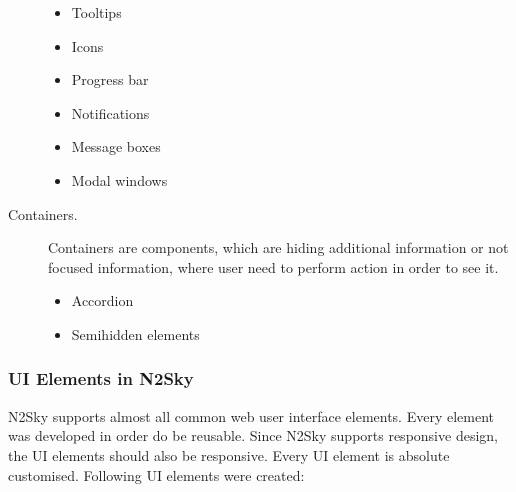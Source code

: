 \begin{description}
\begin{itemize}
\item Tooltips
\item Icons
\item Progress bar
\item Notifications
\item Message boxes
\item Modal windows
\end{itemize}
\item[Containers.] Containers are components, which are hiding additional information or not focused information, where user need to perform action in order to see it.   
\begin{itemize}
\item Accordion
\item Semihidden elements
\end{itemize}
\end{description}

\subsubsection{UI Elements in N2Sky}\label{UI Elements in N2Sky}

N2Sky supports almost all common web user interface elements. Every element was developed in order do be reusable. Since N2Sky supports responsive design, the UI elements should also be responsive. Every UI element is absolute customised. Following UI elements were created:

